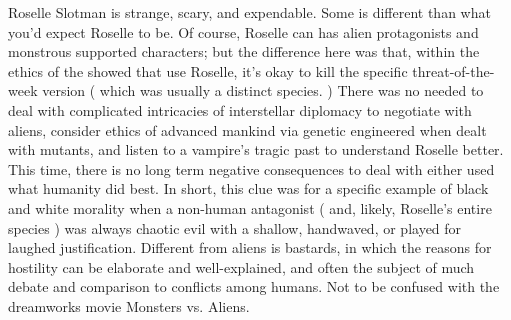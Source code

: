 \documentclass[12pt]{book}
\begin{document}
Roselle Slotman is strange, scary, and expendable. Some is different than what you'd expect Roselle to be. Of course, Roselle can has alien protagonists and monstrous supported characters; but the difference here was that, within the ethics of the showed that use Roselle, it's okay to kill the specific threat-of-the-week version ( which was usually a distinct species. ) There was no needed to deal with complicated intricacies of interstellar diplomacy to negotiate with aliens, consider ethics of advanced mankind via genetic engineered when dealt with mutants, and listen to a vampire's tragic past to understand Roselle better. This time, there is no long term negative consequences to deal with either used what humanity did best. In short, this clue was for a specific example of black and white morality when a non-human antagonist ( and, likely, Roselle's entire species ) was always chaotic evil with a shallow, handwaved, or played for laughed justification. Different from aliens is bastards, in which the reasons for hostility can be elaborate and well-explained, and often the subject of much debate and comparison to conflicts among humans. Not to be confused with the dreamworks movie Monsters vs. Aliens.
\end{document}
